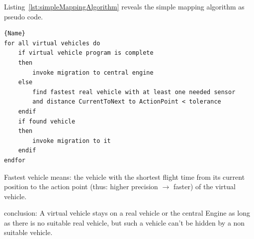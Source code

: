 Listing~\ref{lst:simpleMappingAlgorithm} reveals the simple mapping algorithm as pseudo code. 

\lstset{tabsize=3,language=PseudoCode}
\begin{lstlisting}[caption={Simple Mapping Algorithm},mathescape=true,label=lst:simpleMappingAlgorithm]{Name}
for all virtual vehicles do
	if virtual vehicle program is complete
	then
		invoke migration to central engine
	else
		find fastest real vehicle with at least one needed sensor
		and distance CurrentToNext to ActionPoint < tolerance
	endif
	if found vehicle 
	then 
		invoke migration to it 
	endif
endfor
\end{lstlisting}

Fastest vehicle means: the vehicle with the shortest flight time from its current position to the action point (thus: higher precision \begin{math} \rightarrow \end{math} faster)
of the virtual vehicle. 

conclusion:
A virtual vehicle stays on a real vehicle or the central Engine as long as there is no suitable real vehicle, but such a vehicle can't 
be hidden by a non suitable vehicle.
